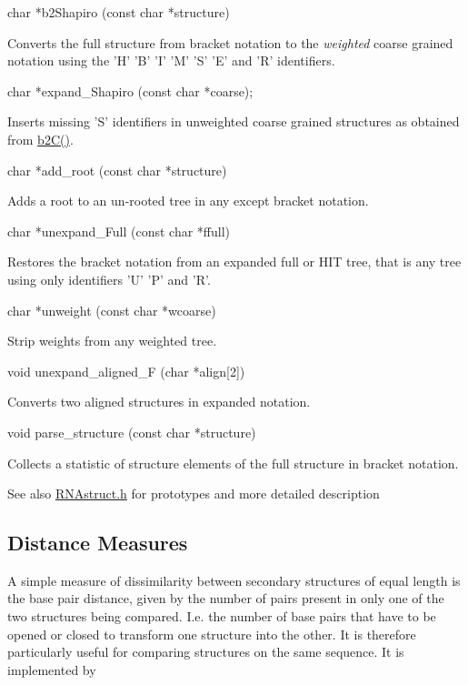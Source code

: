 \begin{DoxyVerb}
char *b2Shapiro (const char *structure)
\end{DoxyVerb}
 Converts the full structure from bracket notation to the {\itshape weighted\/} coarse grained notation using the 'H' 'B' 'I' 'M' 'S' 'E' and 'R' identifiers. 

\begin{DoxyVerb}
char  *expand_Shapiro (const char *coarse);
\end{DoxyVerb}
 Inserts missing 'S' identifiers in unweighted coarse grained structures as obtained from \hyperlink{RNAstruct_8h_a9c80d92391f2833549a8b6dac92233f0}{b2C()}. 

\begin{DoxyVerb}
char *add_root (const char *structure)
\end{DoxyVerb}
 Adds a root to an un-\/rooted tree in any except bracket notation. 

\begin{DoxyVerb}
char  *unexpand_Full (const char *ffull)
\end{DoxyVerb}
 Restores the bracket notation from an expanded full or HIT tree, that is any tree using only identifiers 'U' 'P' and 'R'. 

\begin{DoxyVerb}
char  *unweight (const char *wcoarse)
\end{DoxyVerb}
 Strip weights from any weighted tree. 

\begin{DoxyVerb}
void   unexpand_aligned_F (char *align[2])
\end{DoxyVerb}
 Converts two aligned structures in expanded notation. 

\begin{DoxyVerb}
void   parse_structure (const char *structure)
\end{DoxyVerb}
 Collects a statistic of structure elements of the full structure in bracket notation. 

\begin{DoxySeeAlso}{See also}
\hyperlink{RNAstruct_8h}{RNAstruct.h} for prototypes and more detailed description
\end{DoxySeeAlso}
\subsection*{Distance Measures}

A simple measure of dissimilarity between secondary structures of equal length is the base pair distance, given by the number of pairs present in only one of the two structures being compared. I.e. the number of base pairs that have to be opened or closed to transform one structure into the other. It is therefore particularly useful for comparing structures on the same sequence. It is implemented by

